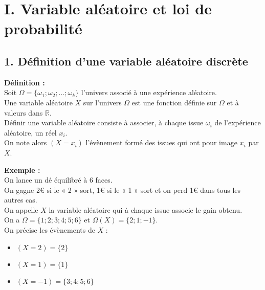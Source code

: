 \documentclass[11pt,a4paper]{article}
\title{\doctitre}
\author{\docniveau \\ \doctheme\text{ - }\doctype}
\date{}
\begin{document}
\maketitle
\pagestyle{custom}
\thispagestyle{custom}

\section*{I. Variable aléatoire et loi de probabilité}

\subsection*{1. Définition d'une variable aléatoire discrète}

\begin{mdframed}[style=definitionStyle]
    \textbf{Définition :} ~\\
    Soit $\Omega=\{\omega_1;\omega_2;\dots;\omega_k\}$ l'univers associé à une expérience aléatoire. \\
    Une variable aléatoire $X$ sur l'univers $\Omega$ est une fonction définie sur $\Omega$ et à valeurs dans $\mathbb{R}$. \\
    Définir une variable aléatoire consiste à associer, à chaque issue $\omega_i$ de l'expérience aléatoire, un réel $x_i$. \\
    On note alors $\left(X=x_i\right)$ l'évènement formé des issues qui ont pour image $x_i$ par $X$.
\end{mdframed}

\textbf{Exemple :} ~\\
On lance un dé équilibré à 6 faces. \\
On gagne 2€ si le « 2 » sort, 1€ si le « 1 » sort et on perd 1€ dans tous les autres cas. \\
On appelle $X$ la variable aléatoire qui à chaque issue associe le gain obtenu. \\

On a $\Omega=\{1;2;3;4;5;6\}$ et $\Omega(X)=\{2;1;-1\}$. \\
On précise les évènements de $X$ :
\vspace{-4pt}
\begin{itemize}
    \item $(X=2)=\{2\}$
    \item $(X=1)=\{1\}$
    \item $(X=-1)=\{3;4;5;6\}$
\end{itemize}
\end{document}

